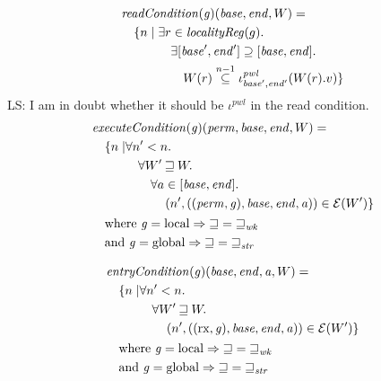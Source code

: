 \documentclass{article}
\newcommand{\nsubeq}[1][n]{\stackrel{\tiny{#1}}{\subseteq}}
\newcommand\lau[1]{{\color{purple} \sf \footnotesize {LS: #1}}\\}
\newcommand{\var}[1]{\mathit{#1}}
\newcommand{\gl}{\var{g}}
\newcommand{\addr}{\var{a}}
\newcommand{\start}{\var{base}}
\newcommand{\addrend}{\var{end}}
\newcommand{\perm}{\var{perm}}
\newcommand{\plainfun}[2]{
  \ifthenelse{\equal{#2}{}}
             {\mathit{#1}}
             {\mathit{#1}(#2)}
}
\newcommand{\readCond}[1]{\plainfun{readCondition}{#1}}
\newcommand{\execCond}[1]{\plainfun{executeCondition}{#1}}
\newcommand{\entryCond}[1]{\plainfun{entryCondition}{#1}}
\newcommand{\future}{\mathbin{\sqsupseteq}}
\newcommand{\futurewk}{\mathbin{\sqsupseteq}_{\var{wk}}}
\newcommand{\futurestr}{\mathbin{\sqsupseteq}_{\var{str}}}
\newcommand{\asmType}{\plaindom{AsmType}}
\newcommand{\plaindom}[1]{\mathrm{#1}}
\newcommand{\intr}[2]{\mathcal{#1}}
\newcommand{\exprintr}[1]{\intr{E}{#1}}
\newcommand{\stder}{\exprintr{\asmType}}
\newcommand{\npair}[2][n]{\left(#1,#2 \right)}
\newcommand{\plainperm}[1]{\mathrm{#1}}
\newcommand{\exec}{\plainperm{rx}}
\newcommand{\local}{\plainperm{local}}
\newcommand{\glob}{\plainperm{global}}
\begin{document}
\begin{align*}
    & \readCond{}(\gl)(\start,\addrend,W) =  \\
    & \quad \begin{aligned}[t]
              \{ n \mid & \;\exists r \in \var{localityReg}(g) \ldotp \\
              & \;\quad \exists [\start',\addrend'] \supseteq [\start,\addrend] \ldotp \\
              & \;\qquad W(r)\nsubeq[n-1] \iota^{\var{pwl}}_{\start',\addrend'}(W(r).v) \}
            \end{aligned}
\end{align*}
\lau{I am in doubt whether it should be $\iota^{\var{pwl}}$ in the read condition.}

\begin{align*}
  & \execCond{}(\gl)(\perm,\start,\addrend,W) = \\
  & \quad
    \begin{aligned}[t]
      \{ n \mid &  \forall n' < n \ldotp\\
      & \quad \forall W' \future W \ldotp\\
      & \qquad\forall a \in [\start,\addrend] \ldotp\\
      & \qquad \quad \npair[n']{((\perm,\gl),\start,\addrend,\addr)} \in \stder(W')\}
    \end{aligned} \\
  & \quad \text{where } \gl = \local \Rightarrow \future = \futurewk \\
  & \quad \text{and } \gl = \glob \Rightarrow \future = \futurestr
\end{align*}

\begin{align*}
  & \entryCond{}(\gl)(\start,\addrend,\addr,W) = \\
  & \quad
    \begin{aligned}[t]
      \{ n \mid &  \forall n' < n \ldotp\\
      & \quad \forall W' \future W \ldotp\\
      & \qquad \npair[n']{((\exec,\gl),\start,\addrend,\addr)} \in \stder(W')\}
    \end{aligned} \\
  & \quad \text{where } \gl = \local \Rightarrow \future = \futurewk \\
  & \quad \text{and } \gl = \glob \Rightarrow \future = \futurestr
\end{align*}
\end{document}
